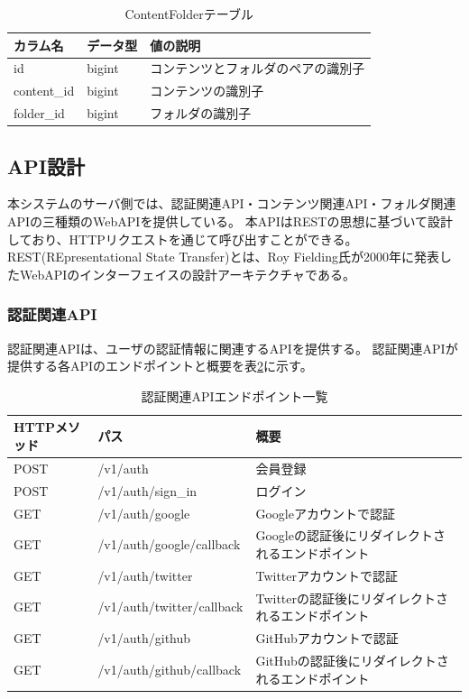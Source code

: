 \begin{table}[htbp]
  \label{tb:design-content-folder-table}
  \caption{ContentFolderテーブル}
  \begin{center}
    \begin{tabular}{|l|l|l|}
      \hline
      カラム名 & データ型 & 値の説明 \\\hline\hline
      id & bigint & コンテンツとフォルダのペアの識別子 \\\hline
      content\_id & bigint & コンテンツの識別子 \\\hline
      folder\_id & bigint & フォルダの識別子 \\\hline
    \end{tabular}
  \end{center}
\end{table}

\subsection{API設計}
本システムのサーバ側では、認証関連API・コンテンツ関連API・フォルダ関連APIの三種類のWebAPIを提供している。
本APIはREST\cite{rest}の思想に基づいて設計しており、HTTPリクエストを通じて呼び出すことができる。
REST(REpresentational State Transfer)とは、Roy Fielding氏が2000年に発表したWebAPIのインターフェイスの設計アーキテクチャである\cite{}。

\subsubsection{認証関連API}
認証関連APIは、ユーザの認証情報に関連するAPIを提供する。
認証関連APIが提供する各APIのエンドポイントと概要を表\ref{tb:design-auth-api}に示す。

\begin{table}[htbp]
  \label{tb:design-auth-api}
  \caption{認証関連APIエンドポイント一覧}
  \begin{center}
    \begin{tabular}{|l|l|l|}
      \hline
      HTTPメソッド & パス & 概要 \\\hline\hline
      POST & /v1/auth & 会員登録 \\\hline
      POST & /v1/auth/sign\_in & ログイン \\\hline
      GET & /v1/auth/google & Googleアカウントで認証 \\\hline
      GET & /v1/auth/google/callback & Googleの認証後にリダイレクトされるエンドポイント \\\hline
      GET & /v1/auth/twitter & Twitterアカウントで認証 \\\hline
      GET & /v1/auth/twitter/callback & Twitterの認証後にリダイレクトされるエンドポイント \\\hline
      GET & /v1/auth/github & GitHubアカウントで認証 \\\hline
      GET & /v1/auth/github/callback & GitHubの認証後にリダイレクトされるエンドポイント \\\hline
    \end{tabular}
  \end{center}
\end{table}

